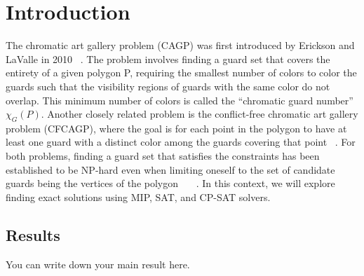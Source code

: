 \chapter{Introduction}
The chromatic art gallery problem (CAGP) was first introduced by Erickson and LaValle in 2010 ~\cite{erickson2010chromatic}. The problem involves finding a guard set that covers the entirety of a given polygon P, requiring the smallest number of colors to color the guards such that the visibility regions of guards with the same color do not overlap. This minimum number of colors is called the ``chromatic guard number'' $\chi_G(P)$. Another closely related problem is the conflict-free chromatic art gallery problem (CFCAGP), where the goal is for each point in the polygon to have at least one guard with a distinct color among the guards covering that point ~\cite{bartschi2014conflict}. For both problems, finding a guard set that satisfies the constraints has been established to be NP-hard even when limiting oneself to the set of candidate guards being the vertices of the polygon ~\cite{fekete2014chromatic}~\cite{erickson2011many}~\cite{iwamoto2022vertex}. In this context, we will explore finding exact solutions using MIP, SAT, and CP-SAT solvers.

\section{Results}
You can write down your main result here.

